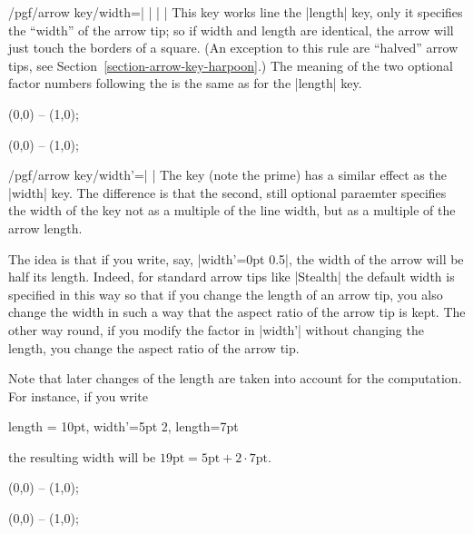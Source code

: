 \begin{key}{/pgf/arrow key/width=| |%
    | |}
  This key works line the |length| key, only it specifies the
  ``width'' of the arrow tip; so if width and length are identical, the
  arrow will just touch the borders of a square. (An exception to this
  rule are ``halved'' arrow tips, see
  Section~\ref{section-arrow-key-harpoon}.) The meaning of the two
  optional factor numbers following the  is the same
  as for the |length| key.
\begin{codeexample}[]
\tikz \draw [arrows = {-Latex[width=10pt, length=10pt]}] (0,0) -- (1,0);
\end{codeexample}
\begin{codeexample}[]
\tikz \draw [arrows = {-Latex[width=0pt 10, length=10pt]}] (0,0) -- (1,0);
\end{codeexample}
\end{key}

\begin{key}{/pgf/arrow key/width'=| |}
  The key (note the prime) has a similar effect as the |width|
  key. The difference is that the second, still optional paraemter
   specifies the width of the key not as a
  multiple of the line width, but as a multiple of the arrow length.

  The idea is that if you write, say, |width'=0pt 0.5|, the width of
  the arrow will be half its length. Indeed, for standard arrow tips
  like |Stealth| the default width is specified in this way so that if
  you change the length of an arrow tip, you also change the width in
  such a way that the aspect ratio of the arrow tip is kept. The other
  way round, if you modify the factor in |width'| without changing the
  length, you change the aspect ratio of the arrow tip.

  Note that later changes of the length are taken into account for the
  computation. For instance, if you write
\begin{codeexample}
length = 10pt, width'=5pt 2, length=7pt    
\end{codeexample}
  the resulting width will be $19\mathrm{pt} = 5\mathrm{pt} + 2\cdot
  7\mathrm{pt}$.

\begin{codeexample}[]
\tikz \draw [arrows = {-Latex[width'=0pt .5, length=10pt]}] (0,0) -- (1,0);
\end{codeexample}
\begin{codeexample}[]
\tikz \draw [arrows = {-Latex[width'=0pt .5, length=15pt]}] (0,0) -- (1,0);
\end{codeexample}
\end{key}



